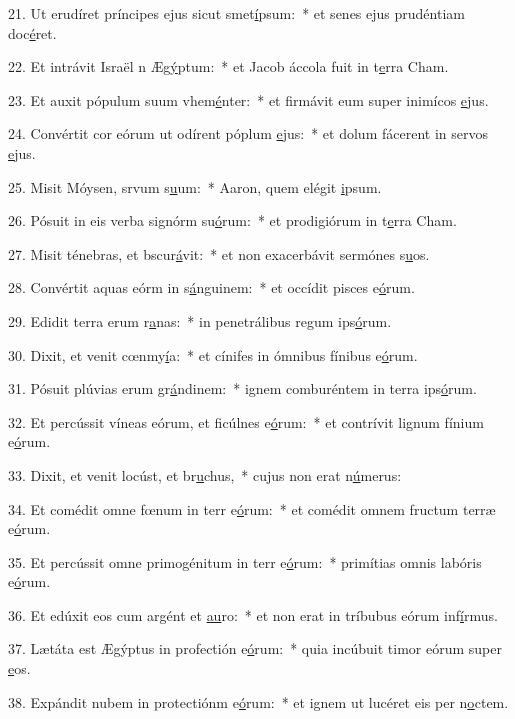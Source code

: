 21. Ut erudíret príncipes ejus sicut smet\uline{í}psum:~* et senes ejus prudéntiam doc\uline{é}ret.\par 
22. Et intrávit Israël n Æg\uline{ý}ptum:~* et Jacob áccola fuit in t\uline{e}rra Cham.\par 
23. Et auxit pópulum suum vhem\uline{é}nter:~* et firmávit eum super inimícos \uline{e}jus.\par 
24. Convértit cor eórum ut odírent póplum \uline{e}jus:~* et dolum fácerent in servos \uline{e}jus.\par 
25. Misit Móysen, srvum s\uline{u}um:~* Aaron, quem elégit \uline{i}psum.\par 
26. Pósuit in eis verba signórm su\uline{ó}rum:~* et prodigiórum in t\uline{e}rra Cham.\par 
27. Misit ténebras, et bscur\uline{á}vit:~* et non exacerbávit sermónes s\uline{u}os.\par 
28. Convértit aquas eórm in s\uline{á}nguinem:~* et occídit pisces e\uline{ó}rum.\par 
29. Edidit terra erum r\uline{a}nas:~* in penetrálibus regum ips\uline{ó}rum.\par 
30. Dixit, et venit cœnmy\uline{í}a:~* et cínifes in ómnibus fínibus e\uline{ó}rum.\par 
31. Pósuit plúvias erum gr\uline{á}ndinem:~* ignem comburéntem in terra ips\uline{ó}rum.\par 
32. Et percússit víneas eórum, et ficúlnes e\uline{ó}rum:~* et contrívit lignum fínium e\uline{ó}rum.\par 
33. Dixit, et venit locúst, et br\uline{u}chus,~* cujus non erat n\uline{ú}merus:\par 
34. Et comédit omne fœnum in terr e\uline{ó}rum:~* et comédit omnem fructum terræ e\uline{ó}rum.\par 
35. Et percússit omne primogénitum in terr e\uline{ó}rum:~* primítias omnis labóris e\uline{ó}rum.\par 
36. Et edúxit eos cum argént et \uline{au}ro:~* et non erat in tríbubus eórum inf\uline{í}rmus.\par 
37. Lætáta est Ægýptus in profectión e\uline{ó}rum:~* quia incúbuit timor eórum super \uline{e}os.\par 
38. Expándit nubem in protectiónm e\uline{ó}rum:~* et ignem ut lucéret eis per n\uline{o}ctem.\par 
